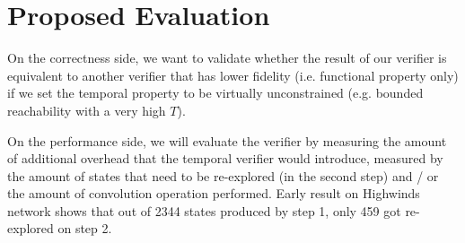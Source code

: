 \documentclass[10pt,sigconf,letterpaper,anonymous,nonacm]{acmart}
\begin{document}

\section{Proposed Evaluation}
On the correctness side, we want to validate whether the result of our verifier is equivalent to 
another verifier that has lower fidelity (i.e. functional property only) if we set the temporal 
property to be virtually unconstrained (e.g. bounded reachability with a very high $T$).

On the performance side, we will evaluate the verifier by measuring the amount of additional 
overhead that the temporal verifier would introduce, measured by the amount of states that 
need to be re-explored (in the second step) and / or the amount of convolution operation performed. 
Early result on Highwinds \cite{knight2011internet} network shows that out of 2344 states 
produced by step 1, only 459 got re-explored on step 2.



\end{document}
